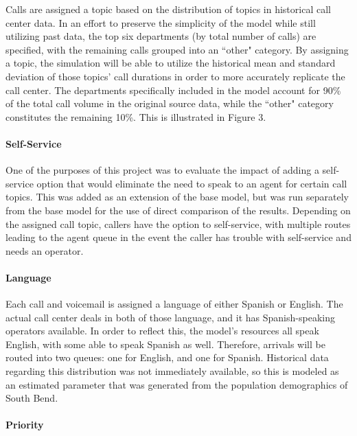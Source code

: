 \documentclass[12pt]{article}
\begin{document}
Calls are assigned a topic based on the distribution of topics in historical call center data.  In an effort to preserve the simplicity of the model while still utilizing past data, the top six departments (by total number of calls) are specified, with the remaining calls grouped into an ``other" category.  By assigning a topic, the simulation will be able to utilize the historical mean and standard deviation of those topics' call durations in order to more accurately replicate the call center.  The departments specifically included in the model account for 90\% of the total call volume in the original source data, while the ``other" category constitutes the remaining 10\%.  This is illustrated in Figure 3.

	\paragraph{Self-Service}
	
One of the purposes of this project was to evaluate the impact of adding a self-service option that would eliminate the need to speak to an agent for certain call topics.  This was added as an extension of the base model, but was run separately from the base model for the use of direct comparison of the results.  Depending on the assigned call topic, callers have the option to self-service, with multiple routes leading to the agent queue in the event the caller has trouble with self-service and needs an operator.

	\paragraph{Language}

Each call and voicemail is assigned a language of either Spanish or English.  The actual call center deals in both of those language, and it has Spanish-speaking operators available.  In order to reflect this, the model's resources all speak English, with some able to speak Spanish as well.  Therefore, arrivals will be routed into two queues:  one for English, and one for Spanish.  Historical data regarding this distribution was not immediately available, so this is modeled as an estimated parameter that was generated from the population demographics of South Bend.

	\paragraph{Priority}
\end{document}
